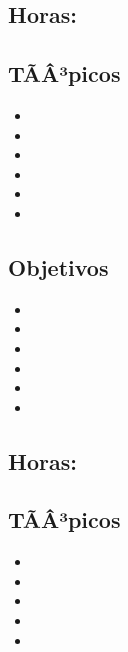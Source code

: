 \subsection*{Horas: \PFUNOHours}

\subsection*{TÃÂ³picos}
\begin{itemize}
	\item \PFUNOTopicSintaxis
	\item \PFUNOTopicVariables
	\item \PFUNOTopicEntrada
	\item \PFUNOTopicEstructuras
	\item \PFUNOTopicFunciones
	\item \PFUNOTopicDescomposicion
\end{itemize}

\subsection*{Objetivos}
\begin{itemize}
	\item \PFUNOObjUNO
	\item \PFUNOObjDOS
	\item \PFUNOObjTRES
	\item \PFUNOObjCUATRO
	\item \PFUNOObjCINCO
	\item \PFUNOObjSEIS
\end{itemize}

\subsection{\PFDOSDef}\label{sec:BOK-PF2}
\subsection*{Horas: \PFDOSHours}

\subsection*{TÃÂ³picos}
\begin{itemize}
	\item \PFDOSTopicEstrategias
	\item \PFDOSTopicEl
	\item \PFDOSTopicEstrategiasde
	\item \PFDOSTopicEstrategiasdedepuracion
	\item \PFDOSTopicElConcepto
\end{itemize}

